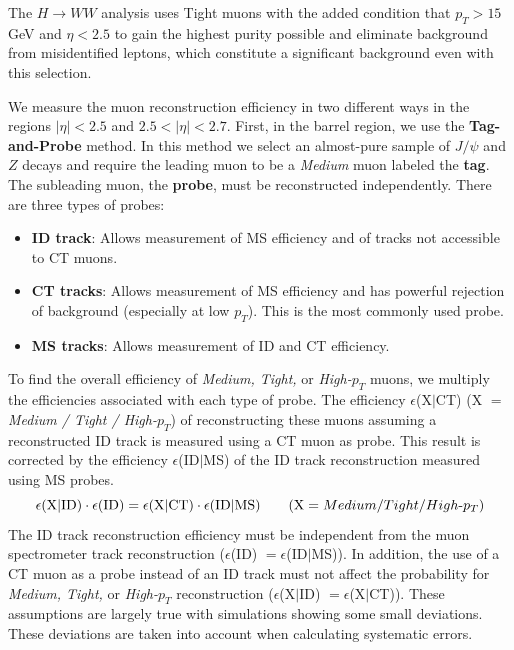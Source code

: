 The $H\rightarrow WW$ analysis uses Tight muons with the added condition that $p_T>15$ GeV and $\eta<2.5$ to gain the highest purity possible and eliminate background from misidentified leptons, which constitute a significant background even with this selection. 

We measure the muon reconstruction efficiency in two different ways in the regions $|\eta|  < 2.5$ and $2.5 < |\eta|  < 2.7$. First, in the barrel region, we use the \textbf{Tag-and-Probe} method. In this method we select an almost-pure sample of $J/\psi$ and $Z$ decays and require the leading muon to be a \textit{Medium} muon labeled the \textbf{tag}. The subleading muon, the \textbf{probe}, must be reconstructed independently. There are three types of probes:
\begin{itemize}
\item \textbf{ID track}: Allows measurement of MS efficiency and of tracks not accessible to CT muons. 
\item \textbf{CT tracks}: Allows measurement of MS efficiency and has powerful rejection of background (especially at low $p_T$). This is the most commonly used probe. 
\item \textbf{MS tracks}: Allows measurement of ID and CT efficiency.
\end{itemize}

To find the overall efficiency of \textit{Medium, Tight,} or \textit{High-$p_T$} muons, we multiply the efficiencies associated with each type of probe. The efficiency  $\epsilon$(X$|$CT) (X $=$ \textit{Medium / Tight / High-$p_T$}) of reconstructing these muons assuming a reconstructed ID track is measured using a CT muon as probe. This result is corrected by the efficiency $\epsilon$(ID$|$MS) of the ID track reconstruction measured using MS probes.
\begin{equation}
\epsilon \textrm{(X$|$ID)} \cdot \epsilon \textrm{(ID)} = \epsilon \textrm{(X$|$CT)} \cdot \epsilon \textrm{(ID$|$MS)} \hspace{20 pt} (\textrm{X} = Medium/Tight/High\textrm{-}p_T)
\end{equation}
The ID track reconstruction efficiency must be independent from the muon spectrometer track reconstruction ($\epsilon$(ID) $= \epsilon$(ID$|$MS)). In addition, the use of a CT muon as a probe instead of an ID track must not affect the probability for \textit{Medium, Tight,} or \textit{High-$p_T$} reconstruction ($\epsilon$(X$|$ID) $= \epsilon$(X$|$CT)). These assumptions are largely true with simulations showing some small deviations. These deviations are taken into account when calculating systematic errors. 

